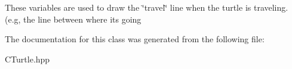 These variables are used to draw the \char`\"{}travel\char`\"{} line when the turtle is traveling. (e.\+g, the line between where it\textquotesingle{}s going 

The documentation for this class was generated from the following file\+:\begin{DoxyCompactItemize}
\item 
C\+Turtle.\+hpp\end{DoxyCompactItemize}
